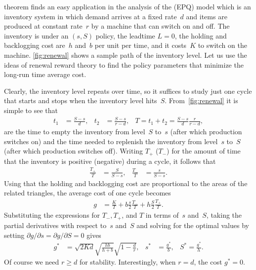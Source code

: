 \documentclass[stochastic-or.tex]{subfiles}
\begin{document}
 theorem finds an easy application in the analysis of the  (EPQ) model which is an inventory system in which demand arrives at a fixed rate~$d$ and items are produced at constant rate~$r$ by a machine that can switch on and off.
The inventory is under an $(s,S)$ policy, the leadtime $L=0$, the holding and backlogging cost are~$h$ and~$b$ per unit per time, and it costs~$K$ to switch on the machine.
\cref{fig:renewal} shows a sample path of the inventory level.
Let us use the ideas of renewal reward theory to find the policy parameters that minimize the long-run time average cost.


Clearly, the inventory level repeats over time, so it suffices to study just one cycle that starts and stops when the inventory level hits~$S$.
From~\cref{fig:renewal} it is simple to see that
  \begin{align*}
    t_1 &= \frac{S-s}{d}, & t_2 &= \frac{S-s}{r-d}, & T = t_1+t_{2} = \frac{S-s}{d}\frac{r}{r-d},
  \end{align*}
are the time to empty the inventory from level~$S$ to~$s$ (after which production switches on) and the time needed to replenish the inventory from level~$s$ to~$S$ (after which production switches off).
Writing $T_+$ ($T_-$) for the amount of time that the inventory is positive (negative) during a cycle, it follows that
\begin{align*}
\frac{T_+}T &= \frac{S}{S-s},
& \frac{T_-}T &= \frac{s}{S-s}.
\end{align*}
Using that the holding and backlogging cost are proportional to the areas of the related triangles,  the average cost of one cycle becomes
\begin{align*}
g
&=\frac{K}{T} +  b\frac{s}{2} \frac{T_-} T  + h\frac{S}{2} \frac{T_+}{T}.
\end{align*}
Substituting the expressions for $T_{-}, T_{+}$, and $T$ in terms of~$s$ and~$S$, taking the partial derivatives with respect to~$s$ and~$S$ and solving for the optimal values by setting $\partial g/\partial s = \partial g/\partial S = 0$ gives
\begin{align}\label{eq:renewal1}
g^{*} &= \sqrt{2Kd} \sqrt{\frac{hb}{h+b}}\sqrt{1-\frac d r}, & s^{*} &= \frac{g^{*}}b, & S^{*} = \frac{g^{*}}{h}.
\end{align}
Of course we need  $r\geq d$ for stability. Interestingly, when $r=d$, the cost $g^{*} = 0$.
\end{document}
